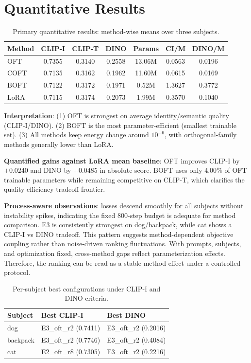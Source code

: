 \documentclass[10pt,twocolumn]{article}
\begin{document}
\section{Quantitative Results}
\begin{table}[t]
\centering
\caption{Primary quantitative results: method-wise means over three subjects.}
{\scriptsize
\setlength{\tabcolsep}{3pt}
\begin{tabular}{@{}lcccccc@{}}
\toprule
Method & CLIP-I & CLIP-T & DINO & Params & CI/M & DINO/M \\
\midrule
OFT  & 0.7355 & 0.3140 & 0.2558 & 13.06M & 0.0563 & 0.0196 \\
COFT & 0.7135 & 0.3162 & 0.1962 & 11.60M & 0.0615 & 0.0169 \\
BOFT & 0.7122 & 0.3172 & 0.1971 & 0.52M  & 1.3627 & 0.3772 \\
LoRA & 0.7115 & 0.3174 & 0.2073 & 1.99M  & 0.3570 & 0.1040 \\
\bottomrule
\end{tabular}
}
\end{table}

\textbf{Interpretation}:
(1) OFT is strongest on average identity/semantic quality (CLIP-I/DINO).
(2) BOFT is the most parameter-efficient (smallest trainable set).
(3) All methods keep energy change around $10^{-6}$, with orthogonal-family methods generally lower than LoRA.

\textbf{Quantified gains against LoRA mean baseline}: OFT improves CLIP-I by
$+0.0240$ and DINO by $+0.0485$ in absolute score. BOFT uses only
$4.00\%$ of OFT trainable parameters while remaining competitive on CLIP-T,
which clarifies the quality-efficiency tradeoff frontier.

\textbf{Process-aware observations}: losses descend smoothly for all subjects
without instability spikes, indicating the fixed 800-step budget is adequate
for method comparison. E3 is consistently strongest on dog/backpack, while cat
shows a CLIP-I vs DINO tradeoff.
This pattern suggests method-dependent objective coupling rather than noise-driven ranking fluctuations.
With prompts, subjects, and optimization fixed, cross-method gaps reflect parameterization effects.
Therefore, the ranking can be read as a stable method effect under a controlled protocol.

\begin{table}[t]
\centering
\caption{Per-subject best configurations under CLIP-I and DINO criteria.}
\begin{tabular}{@{}lll@{}}
\toprule
Subject & Best CLIP-I & Best DINO \\
\midrule
dog & E3\_oft\_r2 (0.7411) & E3\_oft\_r2 (0.2016) \\
backpack & E3\_oft\_r2 (0.7746) & E3\_oft\_r2 (0.4084) \\
cat & E2\_oft\_r8 (0.7305) & E3\_oft\_r2 (0.2216) \\
\bottomrule
\end{tabular}
\end{table}
\end{document}
